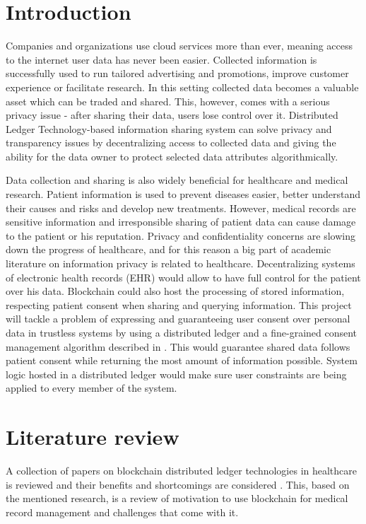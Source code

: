 \documentclass[12pt]{article}
\begin{document}
    \newpage
    \tableofcontents

    \newpage
    \section{Introduction}
    Companies and organizations use cloud services more than ever, meaning access to the internet user data has never been easier. Collected information is successfully used to run tailored advertising and promotions, improve customer experience or facilitate research. In this setting collected data becomes a valuable asset which can be traded and shared. This, however, comes with a serious privacy issue - after sharing their data, users lose control over it. Distributed Ledger Technology-based information sharing system can solve privacy and transparency issues by decentralizing access to collected data and giving the ability for the data owner to protect selected data attributes algorithmically.

    Data collection and sharing is also widely beneficial for healthcare and medical research. Patient information is used to prevent diseases easier, better understand their causes and risks and develop new treatments. However, medical records are sensitive information and irresponsible sharing of patient data can cause damage to the patient or his reputation. Privacy and confidentiality concerns are slowing down the progress of healthcare, and for this reason a big part of academic literature on information privacy is related to healthcare. Decentralizing systems of electronic health records (EHR) would allow to have full control for the patient over his data. Blockchain could also host the processing of stored information, respecting patient consent when sharing and querying information. This project will tackle a problem of expressing and guaranteeing user consent over personal data in trustless systems by using a distributed ledger and a fine-grained consent management algorithm described in \cite{konstantinidis}. This would guarantee shared data follows patient consent while returning the most amount of information possible. System logic hosted in a distributed ledger would make sure user constraints are being applied to every member of the system.

    \section{Literature review}
    A collection of papers on blockchain distributed ledger technologies in healthcare is reviewed and their benefits and shortcomings are considered \cite{dlt}. This, based on the mentioned research, is a review  of motivation to use blockchain for medical record management and challenges that come with it.
\end{document}
